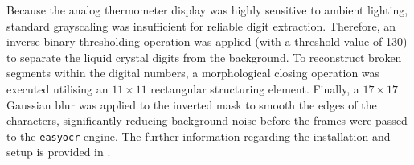 \documentclass[conference]{IEEEtran}
\begin{document}
Because the analog thermometer display was highly sensitive to ambient lighting, standard grayscaling was insufficient for reliable digit extraction. Therefore, an inverse binary thresholding operation was applied (with a threshold value of 130) to separate the liquid crystal digits from the background. To reconstruct broken segments within the digital numbers, a morphological closing operation was executed utilising an $11 \times 11$ rectangular structuring element. Finally, a $17 \times 17$ Gaussian blur was applied to the inverted mask to smooth the edges of the characters, significantly reducing background noise before the frames were passed to the \texttt{easyocr} engine. The further information regarding the installation and setup is provided in .





\end{document}
